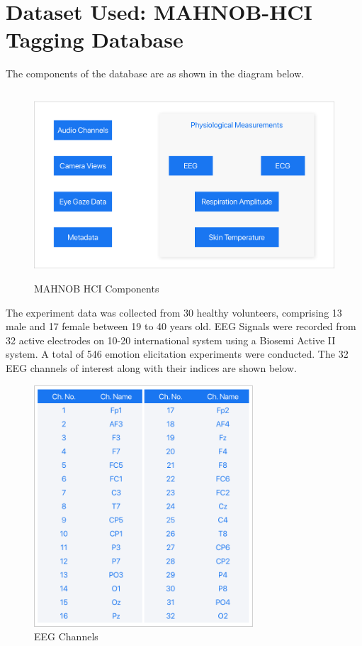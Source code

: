 
\chapter{Dataset Used: MAHNOB-HCI Tagging Database} %

\label{Chapter4} %


The components of the database are as shown in the diagram below.

\begin{figure}[H]
\centering
\includegraphics[height=7cm]{Figures/dataset.png}
\caption{MAHNOB HCI Components}
\label{fig21}
\end{figure}

The experiment data was collected from 30 healthy volunteers, comprising 13 male and 17 female between 19 to 40 years old. EEG Signals were recorded from 32 active electrodes on 10-20 international system using a Biosemi Active II system. A total of 546 emotion elicitation experiments were conducted. The 32 EEG channels of interest along with their indices are shown below.

\begin{figure}[H]
\centering
\includegraphics[height=9cm]{Figures/channels.png}
\caption{EEG Channels}
\label{fig22}
\end{figure}

